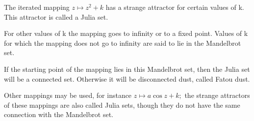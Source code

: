  The iterated mapping $ z \mapsto z^2 + k $ has a strange attractor
for certain values of k. This attractor is called a Julia set. 
\par
For other values of k the mapping goes to infinity or to a fixed point.
Values of k for which the mapping does not go to infinity are said
to lie in the Mandelbrot set.
\par
If the starting point of the mapping lies in this Mandelbrot set,
then the Julia set will be a connected set. Otherwise it will be
disconnected dust, called Fatou dust.
\par
Other mappings may be used, for instance $ z \mapsto a \cos z + k ; $
the strange attractors of these mappings are also called Julia sets,
though they do not have the same connection with the Mandelbrot set.
